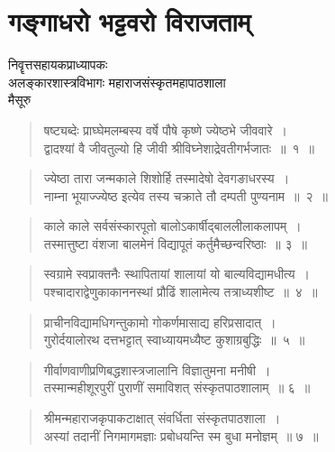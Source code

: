 {\fontsize{16}{18}\selectfont
\presetvalues
\chapter{गङ्गाधरो भट्टवरो विराजताम्}

\begin{center}
\smallskip

निवॄत्तसहायकप्राध्यापकः\\
अलङ्कारशास्त्रविभागः 
महाराजसंस्कृतमहापाठशाला\\ 
मैसूरु
\addrule
\end{center}

\begin{verse}
षष्ट्यब्देः प्राघ्घेमलम्बस्य वर्षे पौषे कृष्णे ज्येष्ठभे जीववारे~।\\
द्वादश्यां वै जीवतुल्यो हि जीवी श्रीविघ्नेशाद्रेवतीगर्भजातः~॥~१~॥
\end{verse}

\begin{verse}
ज्येष्ठा तारा जन्मकाले शिशोर्हि तस्मादेषो देवगङाधरस्य~।\\
नाम्ना भूयाज्ज्येष्ठ इत्येव तस्य चक्राते तौ दम्पती पुण्यनाम~॥~२~॥
\end{verse}

\begin{verse}
काले काले सर्वसंस्कारपूतो बालोऽकार्षीद्बाललीलाकलापम्~।\\
तस्मात्तुष्टा वंशजा बालमेनं विद्यापूतं कर्तुमैच्छन्वरिष्ठाः~॥ ३~॥
\end{verse}

\begin{verse}
स्वग्रामे स्वप्राक्तनैः स्थापितायां शालायां यो बाल्यविद्यामधीत्य~।\\
पश्चादाराद्वेणुकाकाननस्थां प्रौढिं शालामेत्य तत्राध्यशीष्ट~॥~४~॥
\end{verse}

\begin{verse}
प्राचीनविद्यामधिगन्तुकामो गोकर्णमासाद्य हरिप्रसादात्~।\\
गुरोर्दयालोरथ दत्तभट्टात् स्वाध्यायमध्यैष्ट कुशाग्रबुद्धिः~॥~५~॥
\end{verse}

\begin{verse}
गीर्वाणवाणीप्रणिबद्धशास्त्रजालानि विज्ञातुमना मनीषी~।\\
तस्मान्महीशूरपुरीं पुराणीं समाविशत् संस्कृतपाठशालाम्~॥ ६~॥
\end{verse}

\begin{verse}
श्रीमन्महाराजकृपाकटाक्षात् संवर्धिता संस्कृतपाठशाला~।\\
अस्यां तदानीं निगमागमज्ञाः प्रबोधयन्ति स्म बुधा मनोज्ञम्~॥ ७~॥
\end{verse}

}
